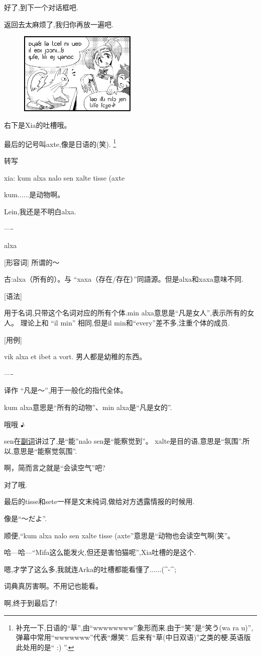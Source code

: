 好了,到下一个对话框吧.


返回去太麻烦了,我归你再放一遍吧.


\begin{figure}[H]
\includegraphics[width=0.5\textwidth]{ARKA/uni3.png}%
\end{figure}

右下是Xia的吐槽哦。

最后的记号叫axte,像是日语的(笑).
\footnote{补充一下,日语的``草'',由``wwwwwwww''象形而来.由于``笑''是``笑う(wa ra u)'',弹幕中常用``wwwwwww''代表``爆笑''.
后来有``草(中日双语)''之类的梗.英语版此处用的是`` :) ''.
}

\FiveStar 转写

xia: kum alxa nalo sen xalte tisse (axte


kum......是动物啊。

Lein,我还是不明白alxa.

----

alxa 

[形容词] 所谓的～ 

古:alxa（所有的）。与 ``xaxa（存在/存在）''同語源。但是alxa和xaxa意味不同.

[语法] 

用于名词,只带这个名词对应的所有个体.min alxa意思是``凡是女人'',表示所有的女人。
理论上和 ``il min'' 相同,但是il min和``every''差不多,注重个体的成员.

[用例]

vik alxa et ibet a vort. 男人都是幼稚的东西。

----

译作 ``凡是～'',用于一般化的指代全体。

kum alxa意思是``所有的动物''、min alxa是``凡是女的''.


哦哦 ♪

sen在\hyperlink{chapter-adverb}{副词}讲过了,是``能''nalo sen是``能察觉到''。
xalte是目的语,意思是``氛围''.所以,意思是``能察觉氛围''.


啊，简而言之就是“会读空气”吧?


对了哦.


最后的tisse和sete一样是文末纯词,做给对方透露情报的时候用.

像是``～だよ''.


顺便,``kum alxa nalo sen xalte tisse (axte''意思是``动物也会读空气啊(笑''。

哈---哈---``Mifa这么能发火,但还是害怕猫呢'',Xia吐槽的是这个.

嗯,才学了这么多,我就连Arka的吐槽都能看懂了......(\^{}-\^{};

词典真厉害啊。不用记也能看。

啊,终于到最后了!






